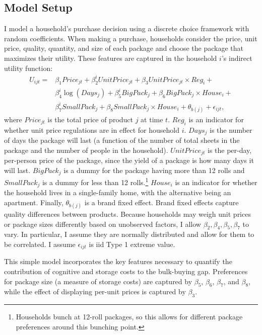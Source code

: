 \documentclass[AER]{AEA_mal}
\begin{document}
\subsection{Model Setup}
I model a household's purchase decision using a discrete choice framework with random coefficients. When making a purchase, households consider the price, unit price, quality, quantity, and size of each package and choose the package that maximizes their utility. These features are captured in the household $i$'s indirect utility function:
\begin{align}
\label{eq:mlogit}
U_{ijt} = &\beta_{1} Price_{jt} + \beta^i_2 UnitPrice_{jt} + \beta_3 UnitPrice_{jt} \times Reg_{i} +
\\
&\beta^i_4 \log(Days_{j}) + \beta^i_5 BigPack_j + \beta_6 BigPack_j \times House_i +
\nonumber \\
&\beta^i_7 SmallPack_j + \beta_8 SmallPack_j \times House_i + \theta_{b(j)} + \epsilon_{ijt}, \nonumber
\end{align}
where $Price_{jt}$ is the total price of product $j$ at time $t$. $Reg_i$ is an indicator for whether unit price regulations are in effect for household $i$. $Days_j$ is the number of days the package will last (a function of the number of total sheets in the package and the number of people in the household). $UnitPrice_{jt}$ is the per-day, per-person price of the package, since the yield of a package is how many days it will last. $BigPack_j$ is a dummy for the package having more than 12 rolls and $SmallPack_j$ is a dummy for less than 12 rolls.\footnote{Households bunch at 12-roll packages, so this allows for different package preferences around this bunching point.} $House_i$ is an indicator for whether the household lives in a single-family home, with the alternative being an apartment. Finally, $\theta_{b(j)}$ is a brand fixed effect. Brand fixed effects capture quality differences between products. Because households may weigh unit prices or package sizes differently based on unobserved factors, I allow $\beta_2, \beta_4, \beta_5, \beta_7$ to vary. In particular, I assume they are normally distributed and allow for them to be correlated. I assume $\epsilon_{ijt}$ is iid Type 1 extreme value.

This simple model incorporates the key features necessary to quantify the contribution of cognitive and storage costs to the bulk-buying gap. Preferences for package size (a measure of storage costs) are captured by $\beta_5$, $\beta_6$, $\beta_7$, and $\beta_8$, while the effect of displaying per-unit prices is captured by $\beta_3$.
\end{document}
